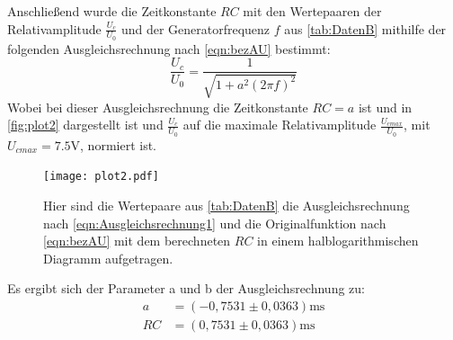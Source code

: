 Anschließend wurde die Zeitkonstante $RC$ mit den Wertepaaren der Relativamplitude $\frac{U_c}{U_0}$ und der Generatorfrequenz $f$
aus \autoref{tab:DatenB} mithilfe der folgenden Ausgleichsrechnung nach \eqref{eqn:bezAU} bestimmt:
\begin{equation}
  \label{eqn:Ausgleichsrechnung1}
  \frac{U_c}{U_0} = \frac{1}{\sqrt{1+a^2(2\pi f)^2}}
\end{equation}
Wobei bei dieser Ausgleichsrechnung die Zeitkonstante $RC = a$ ist und in \autoref{fig:plot2} dargestellt ist und $\frac{U_c}{U_0}$ auf die maximale Relativamplitude $\frac{U_{cmax}}{U_0}$, mit $U_{cmax} = 7.5\unit{\volt}$, normiert ist.
\begin{figure}[H]
  \centering
  \texttt{[image: plot2.pdf]}
  \caption{Hier sind die Wertepaare aus \autoref{tab:DatenB} die Ausgleichsrechnung nach \eqref{eqn:Ausgleichsrechnung1} und die Originalfunktion nach \eqref{eqn:bezAU} mit dem berechneten $RC$ in einem halblogarithmischen Diagramm aufgetragen.}
  \label{fig:plot2}
\end{figure}

Es ergibt sich der Parameter a und b der Ausgleichsrechnung zu:
\begin{align*}
  a &= (-0,7531\pm 0,0363) \unit{\milli\second}\\
  RC &= (0,7531\pm 0,0363) \unit{\milli\second}
\end{align*}

